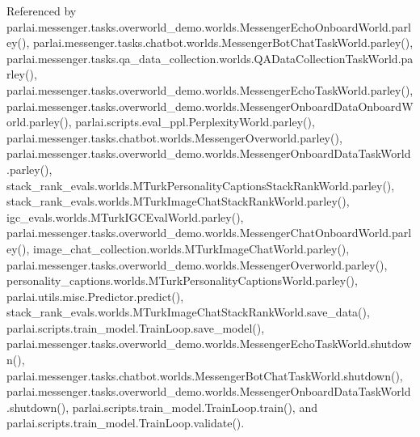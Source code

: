 Referenced by parlai.\+messenger.\+tasks.\+overworld\+\_\+demo.\+worlds.\+Messenger\+Echo\+Onboard\+World.\+parley(), parlai.\+messenger.\+tasks.\+chatbot.\+worlds.\+Messenger\+Bot\+Chat\+Task\+World.\+parley(), parlai.\+messenger.\+tasks.\+qa\+\_\+data\+\_\+collection.\+worlds.\+Q\+A\+Data\+Collection\+Task\+World.\+parley(), parlai.\+messenger.\+tasks.\+overworld\+\_\+demo.\+worlds.\+Messenger\+Echo\+Task\+World.\+parley(), parlai.\+messenger.\+tasks.\+overworld\+\_\+demo.\+worlds.\+Messenger\+Onboard\+Data\+Onboard\+World.\+parley(), parlai.\+scripts.\+eval\+\_\+ppl.\+Perplexity\+World.\+parley(), parlai.\+messenger.\+tasks.\+chatbot.\+worlds.\+Messenger\+Overworld.\+parley(), parlai.\+messenger.\+tasks.\+overworld\+\_\+demo.\+worlds.\+Messenger\+Onboard\+Data\+Task\+World.\+parley(), stack\+\_\+rank\+\_\+evals.\+worlds.\+M\+Turk\+Personality\+Captions\+Stack\+Rank\+World.\+parley(), stack\+\_\+rank\+\_\+evals.\+worlds.\+M\+Turk\+Image\+Chat\+Stack\+Rank\+World.\+parley(), igc\+\_\+evals.\+worlds.\+M\+Turk\+I\+G\+C\+Eval\+World.\+parley(), parlai.\+messenger.\+tasks.\+overworld\+\_\+demo.\+worlds.\+Messenger\+Chat\+Onboard\+World.\+parley(), image\+\_\+chat\+\_\+collection.\+worlds.\+M\+Turk\+Image\+Chat\+World.\+parley(), parlai.\+messenger.\+tasks.\+overworld\+\_\+demo.\+worlds.\+Messenger\+Overworld.\+parley(), personality\+\_\+captions.\+worlds.\+M\+Turk\+Personality\+Captions\+World.\+parley(), parlai.\+utils.\+misc.\+Predictor.\+predict(), stack\+\_\+rank\+\_\+evals.\+worlds.\+M\+Turk\+Image\+Chat\+Stack\+Rank\+World.\+save\+\_\+data(), parlai.\+scripts.\+train\+\_\+model.\+Train\+Loop.\+save\+\_\+model(), parlai.\+messenger.\+tasks.\+overworld\+\_\+demo.\+worlds.\+Messenger\+Echo\+Task\+World.\+shutdown(), parlai.\+messenger.\+tasks.\+chatbot.\+worlds.\+Messenger\+Bot\+Chat\+Task\+World.\+shutdown(), parlai.\+messenger.\+tasks.\+overworld\+\_\+demo.\+worlds.\+Messenger\+Onboard\+Data\+Task\+World.\+shutdown(), parlai.\+scripts.\+train\+\_\+model.\+Train\+Loop.\+train(), and parlai.\+scripts.\+train\+\_\+model.\+Train\+Loop.\+validate().

\mbox{\label{classparlai_1_1messenger_1_1core_1_1worlds_1_1SimpleMessengerOverworld_ae368df3021f5138ada1cc529bdce5081}} 
